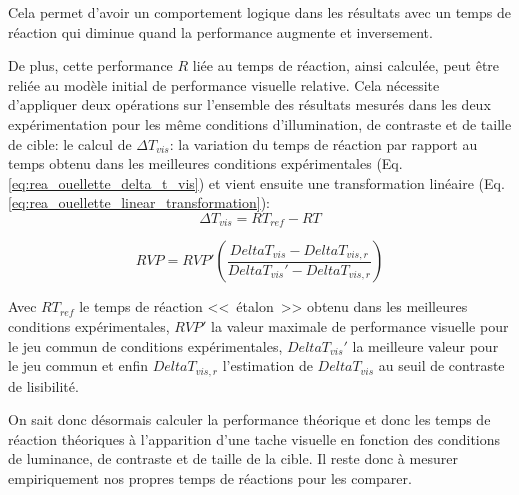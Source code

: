 	\par Cela permet d'avoir un comportement logique dans les résultats avec un temps de réaction qui diminue quand la performance augmente et inversement.
	
	\par De plus, cette performance $R$ liée au temps de réaction, ainsi calculée, peut être reliée au modèle initial de performance visuelle relative. Cela nécessite d'appliquer deux opérations sur l'ensemble des résultats mesurés dans les deux expérimentation pour les même conditions d'illumination, de contraste et de taille de cible: le calcul de $\Delta T_{vis}$: la variation du temps de réaction par rapport au temps obtenu dans les meilleures conditions expérimentales (Eq. \ref{eq:rea_ouellette_delta_t_vis}) et vient ensuite une transformation linéaire (Eq. \ref{eq:rea_ouellette_linear_transformation}):
	\begin{equation}
		\Delta T_{vis} = RT_{ref} - RT
		\label{eq:rea_ouellette_delta_t_vis}
	\end{equation}
	
	\begin{equation}
		RVP = RVP' \left(\frac{Delta T_{vis} - Delta T_{vis,r}}{Delta T_{vis}' - Delta T_{vis,r}}\right)
		\label{eq:rea_ouellette_linear_transformation}
	\end{equation}
	
	\par Avec $RT_{ref}$ le temps de réaction <<~étalon~>> obtenu dans les meilleures conditions expérimentales, $RVP'$ la valeur maximale de performance visuelle pour le jeu commun de conditions expérimentales, $Delta T_{vis}'$ la meilleure valeur pour le jeu commun et enfin $Delta T_{vis,r}$ l'estimation de $Delta T_{vis}$ au seuil de contraste de lisibilité.
	
	\par On sait donc désormais calculer la performance théorique et donc les temps de réaction théoriques à l'apparition d'une tache visuelle en fonction des conditions de luminance, de contraste et de taille de la cible. Il reste donc à mesurer empiriquement nos propres temps de réactions pour les comparer.

